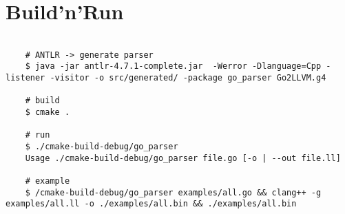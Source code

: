 \documentclass[a4paper,16pt]{article}
\begin{document}
    \section{Build'n'Run}
    \begin{verbatim}
    
    # ANTLR -> generate parser
    $ java -jar antlr-4.7.1-complete.jar  -Werror -Dlanguage=Cpp -listener -visitor -o src/generated/ -package go_parser Go2LLVM.g4
    
    # build
    $ cmake .
    
    # run
    $ ./cmake-build-debug/go_parser
    Usage ./cmake-build-debug/go_parser file.go [-o | --out file.ll]
    
    # example
    $ /cmake-build-debug/go_parser examples/all.go && clang++ -g examples/all.ll -o ./examples/all.bin && ./examples/all.bin
    \end{verbatim}
    
	
\end{document}
